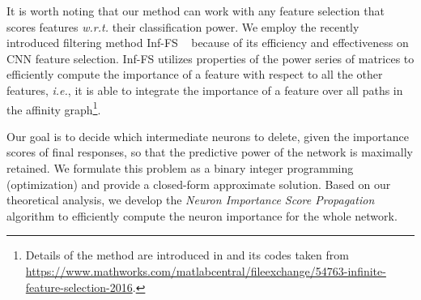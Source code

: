 \documentclass[10pt,twocolumn,letterpaper]{article}
\def\ie{\emph{i.e.}}
\def\wrt{\emph{w.r.t.} }
\begin{document}
It is worth noting that our method can work with any feature selection that scores features \wrt their classification power. We employ the recently introduced filtering method Inf-FS ~\cite{Roffo_2015_ICCV} because of its efficiency and effectiveness on CNN feature selection. 
Inf-FS utilizes properties of the power series of matrices to efficiently compute the  importance of a feature with respect to all the other features, \ie, it is able to integrate the importance of a feature over all paths in the affinity graph\footnote{Details of the method are introduced in \cite{Roffo_2015_ICCV} and its codes taken from {\scriptsize\url{https://www.mathworks.com/matlabcentral/fileexchange/54763-infinite-feature-selection-2016}}.}. 

Our goal is to decide which intermediate neurons to delete, given the importance scores of final responses, so that the predictive power of the network is maximally retained. We formulate this problem as a binary integer programming (optimization) and provide a closed-form approximate solution. Based on our theoretical analysis, we develop the \textit{Neuron Importance Score Propagation} algorithm to efficiently compute the neuron importance for the whole network.
\end{document}
